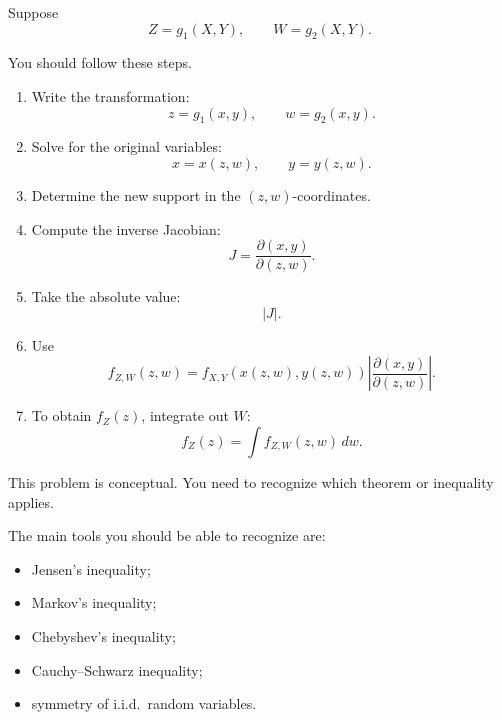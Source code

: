 \documentclass[11pt]{article}
\begin{document}
\begin{toolbox}

Suppose
\[
Z=g_1(X,Y),
\qquad
W=g_2(X,Y).
\]

You should follow these steps.

\begin{enumerate}[leftmargin=*]
    \item Write the transformation:
    \[
    z=g_1(x,y),
    \qquad
    w=g_2(x,y).
    \]

    \item Solve for the original variables:
    \[
    x=x(z,w),
    \qquad
    y=y(z,w).
    \]

    \item Determine the new support in the \((z,w)\)-coordinates.

    \item Compute the inverse Jacobian:
    \[
    J
    =
    \frac{\partial(x,y)}{\partial(z,w)}.
    \]

    \item Take the absolute value:
    \[
    |J|.
    \]

    \item Use
    \[
    f_{Z,W}(z,w)
    =
    f_{X,Y}(x(z,w),y(z,w))
    \left|
    \frac{\partial(x,y)}{\partial(z,w)}
    \right|.
    \]

    \item To obtain \(f_Z(z)\), integrate out \(W\):
    \[
    f_Z(z)
    =
    \int f_{Z,W}(z,w)\,dw.
    \]
\end{enumerate}

\end{toolbox}
 


\newpage
\begin{topicbox}

This problem is conceptual. You need to recognize which theorem or
inequality applies.

The main tools you should be able to recognize are:

\begin{itemize}[leftmargin=*]
    \item Jensen's inequality;
    \item Markov's inequality;
    \item Chebyshev's inequality;
    \item Cauchy--Schwarz inequality;
    \item symmetry of i.i.d.\ random variables.
\end{itemize}

\end{topicbox}
\end{document}
